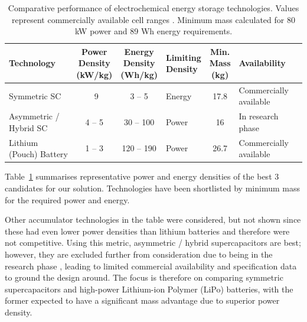 \documentclass[11pt, a4paper]{report}
\numberwithin{equation}{section}
\begin{document}
\begin{refsection}
\begin{table}[htbp]
    \centering
    \caption{Comparative performance of electrochemical energy storage technologies. Values represent commercially available cell ranges \cite{kalaiarasi2024tale}. Minimum mass calculated for 80 kW power and 89 Wh energy requirements.}
    \label{tab:storage_comparison}
    \footnotesize
    \begin{tabular}{|l|c|c|l|c|l|}
        \hline
        \textbf{Technology} & \makecell{\textbf{Power} \\ \textbf{Density} \\ \textbf{(kW/kg)}} & \makecell{\textbf{Energy} \\ \textbf{Density} \\ \textbf{(Wh/kg)}} & \makecell{\textbf{Limiting} \\ \textbf{Density}} & \makecell{\textbf{Min.} \\ \textbf{Mass} \\ \textbf{(kg)}} & \textbf{Availability} \\
        \hline
        Symmetric SC & ~9 & 3 -- 5 & Energy & 17.8 & Commercially available \\
        Asymmetric / Hybrid SC & 4 -- 5 & 30 -- 100 & Power & 16 & In research phase \\
        Lithium (Pouch) Battery & 1 -- 3 & 120 -- 190 & Power & 26.7 & Commercially available \\
        \hline
    \end{tabular}
\end{table}

Table~\ref{tab:storage_comparison} summarises representative power and energy densities of the best 3 candidates for our solution. Technologies have been shortlisted by minimum mass for the required power and energy.

Other accumulator technologies in the table were considered, but not shown since these had even lower power densities than lithium batteries and therefore were not competitive.
Using this metric, asymmetric / hybrid supercapacitors are best; however, they are excluded further from consideration due to being in the research phase \cite{kalaiarasi2024tale}, leading to limited commercial availability and specification data to ground the design around. The focus is therefore on comparing symmetric supercapacitors and high-power Lithium-ion Polymer (LiPo) batteries, with the former expected to have a significant mass advantage due to superior power density.


\end{refsection}
\end{document}
